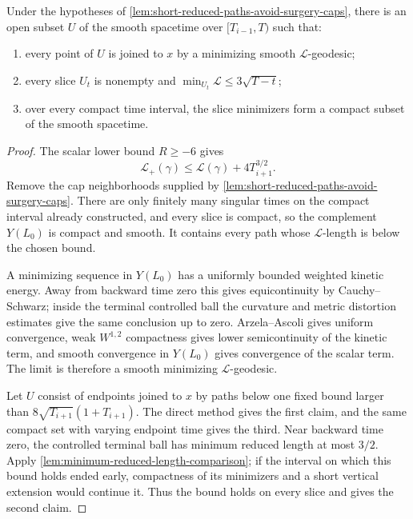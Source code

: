 \begin{proposition}
\label{prop:compact-reduced-minimizing-domain}
\notready
Under the hypotheses of \ref{lem:short-reduced-paths-avoid-surgery-caps},
there is an open subset $U$ of the smooth spacetime over
$[T_{i-1},T)$ such that:
\begin{enumerate}
\item every point of $U$ is joined to $x$ by a minimizing smooth
      $\mathcal L$-geodesic;
\item every slice $U_t$ is nonempty and
      $\min_{U_t}\mathcal L\le3\sqrt{T-t}$;
\item over every compact time interval, the slice minimizers form a compact
      subset of the smooth spacetime.
\end{enumerate}
\end{proposition}

\begin{proof}
The scalar lower bound $R\ge-6$ gives
\[
 \mathcal L_+(\gamma)
 \le\mathcal L(\gamma)+4T_{i+1}^{3/2}.
\]
Remove the cap neighborhoods supplied by
\ref{lem:short-reduced-paths-avoid-surgery-caps}.  There are only finitely
many singular times on the compact interval already constructed, and every
slice is compact, so the complement $Y(L_0)$ is compact and smooth.  It
contains every path whose $\mathcal L$-length is below the chosen bound.

A minimizing sequence in $Y(L_0)$ has a uniformly bounded weighted kinetic
energy.  Away from backward time zero this gives equicontinuity by
Cauchy--Schwarz; inside the terminal controlled ball the curvature and metric
distortion estimates give the same conclusion up to zero.  Arzela--Ascoli
gives uniform convergence, weak $W^{1,2}$ compactness gives lower
semicontinuity of the kinetic term, and smooth convergence in $Y(L_0)$ gives
convergence of the scalar term.  The limit is therefore a smooth minimizing
$\mathcal L$-geodesic.

Let $U$ consist of endpoints joined to $x$ by paths below one fixed bound
larger than $8\sqrt{T_{i+1}}(1+T_{i+1})$.  The direct method gives the first
claim, and the same compact set with varying endpoint time gives the third.
Near backward time zero, the controlled terminal ball has minimum reduced
length at most $3/2$.  Apply
\ref{lem:minimum-reduced-length-comparison}; if the interval on which this
bound holds ended early, compactness of its minimizers and a short vertical
extension would continue it.  Thus the bound holds on every slice and gives
the second claim.
\end{proof}

